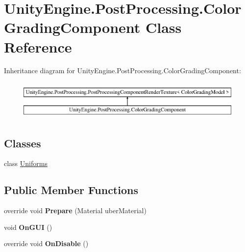 \hypertarget{class_unity_engine_1_1_post_processing_1_1_color_grading_component}{}\section{Unity\+Engine.\+Post\+Processing.\+Color\+Grading\+Component Class Reference}
\label{class_unity_engine_1_1_post_processing_1_1_color_grading_component}
Inheritance diagram for Unity\+Engine.\+Post\+Processing.\+Color\+Grading\+Component\+:\begin{figure}[H]
\begin{center}
\leavevmode
\includegraphics[height=2.000000cm]{class_unity_engine_1_1_post_processing_1_1_color_grading_component}
\end{center}
\end{figure}
\subsection*{Classes}
\begin{DoxyCompactItemize}
\item 
class \hyperlink{class_unity_engine_1_1_post_processing_1_1_color_grading_component_1_1_uniforms}{Uniforms}
\end{DoxyCompactItemize}
\subsection*{Public Member Functions}
\begin{DoxyCompactItemize}
\item 
\mbox{\label{class_unity_engine_1_1_post_processing_1_1_color_grading_component_a6028831311ad34f0f563fa5715c139dc}} 
override void {\bfseries Prepare} (Material uber\+Material)
\item 
\mbox{\label{class_unity_engine_1_1_post_processing_1_1_color_grading_component_abf942f421fab142504cd5be46b804815}} 
void {\bfseries On\+G\+UI} ()
\item 
\mbox{\label{class_unity_engine_1_1_post_processing_1_1_color_grading_component_a888398f3d7e4eeb2809dd9f66b185622}} 
override void {\bfseries On\+Disable} ()
\end{DoxyCompactItemize}

